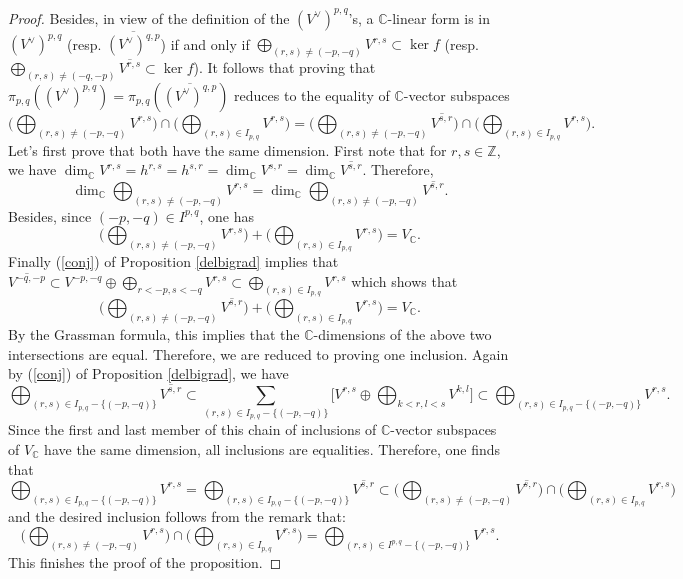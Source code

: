 \documentclass[10pt]{article}
\numberwithin{equation}{subsection}
\theoremstyle{plain}
\theoremstyle{definition}
\theoremstyle{remark}
\newcommand{\Z}{\mathbb Z}
\newcommand{\C}{\mathbb C}
\begin{document}
\begin{proof}
Besides, in view of the definition of the $(V^\vee)^{p,q}$'s, a $\C$-linear form is in $(V^\vee)^{p,q}$ (resp. $\overline{(V^\vee)^{q,p}}$) if and only if $\bigoplus_{(r,s) \neq (-p,-q)}V^{r,s} \subset \ker f$ (resp. $\bigoplus_{(r,s) \neq (-q,-p)}\overline{V^{r,s}} \subset \ker f$). It follows that proving that $\pi_{p,q}((V^\vee)^{p,q}) = \pi_{p,q}(\overline{(V^\vee)^{q,p}})$ reduces to the equality of $\C$-vector subspaces
\[
\Big(\bigoplus_{(r,s) \neq (-p,-q)}V^{r,s} \Big) \cap \Big(\bigoplus_{(r,s)\in I_{p,q}} V^{r,s} \Big) = \Big(\bigoplus_{(r,s) \neq (-p,-q)}\overline{V^{s,r}} \Big) \cap \Big(\bigoplus_{(r,s)\in I_{p,q}} V^{r,s} \Big).
\]
Let's first prove that both have the same dimension. First note that for $r,s \in \Z$, we have $\dim_\C V^{r,s} = h^{r,s} = h^{s,r} = \dim_\C V^{s,r} = \dim_\C \overline{V^{s,r}}$. Therefore,
\[
\dim_\C \bigoplus_{(r,s) \neq (-p,-q)}V^{r,s} = \dim_\C \bigoplus_{(r,s) \neq (-p,-q)}\overline{V^{s,r}}.
\]
Besides, since $(-p,-q) \in I^{p,q}$, one has
\[
\Big(\bigoplus_{(r,s) \neq (-p,-q)}V^{r,s} \Big) + \Big(\bigoplus_{(r,s)\in I_{p,q}} V^{r,s} \Big) = V_\C.
\]
Finally (\ref{conj}) of Proposition \ref{delbigrad} implies that $\overline{V^{-q,-p}} \subset V^{-p,-q} \oplus \bigoplus_{r<-p, s<-q} V^{r,s} \subset \bigoplus_{(r,s) \in I_{p,q}} V^{r,s}$ which shows that
\[
\Big(\bigoplus_{(r,s) \neq (-p,-q)}\overline{V^{s,r}} \Big) + \Big(\bigoplus_{(r,s)\in I_{p,q}} V^{r,s} \Big) = V_\C.
\]
By the Grassman formula, this implies that the $\C$-dimensions of the above two intersections are equal. Therefore, we are reduced to proving one inclusion. Again by (\ref{conj}) of Proposition \ref{delbigrad}, we have
\[
\bigoplus_{(r,s) \in I_{p,q} -\{(-p,-q)\}}\overline{V^{s,r}} \subset \sum_{(r,s) \in I_{p,q} -\{(-p,-q)\}} \Big[V^{r,s} \oplus \bigoplus_{k<r,l<s} V^{k,l}\Big] \subset \bigoplus_{(r,s) \in I_{p,q}-\{(-p,-q)\}} V^{r,s}.
\]
Since the first and last member of this chain of inclusions of $\C$-vector subspaces of $V_\C$ have the same dimension, all inclusions are equalities. Therefore, one finds that
\[
\bigoplus_{(r,s) \in I_{p,q}-\{(-p,-q)\}} V^{r,s} = \bigoplus_{(r,s) \in I_{p,q} -\{(-p,-q)\}}\overline{V^{s,r}} \subset \Big(\bigoplus_{(r,s) \neq (-p,-q)}\overline{V^{s,r}} \Big) \cap \Big(\bigoplus_{(r,s)\in I_{p,q}} V^{r,s} \Big)
\]
and the desired inclusion follows from the remark that:
\[
\Big(\bigoplus_{(r,s) \neq (-p,-q)}V^{r,s} \Big) \cap \Big(\bigoplus_{(r,s)\in I_{p,q}} V^{r,s} \Big) = \bigoplus_{(r,s) \in I^{p,q}-\{(-p,-q)\}} V^{r,s}.
\]
This finishes the proof of the proposition.
\end{proof}
\end{document}

